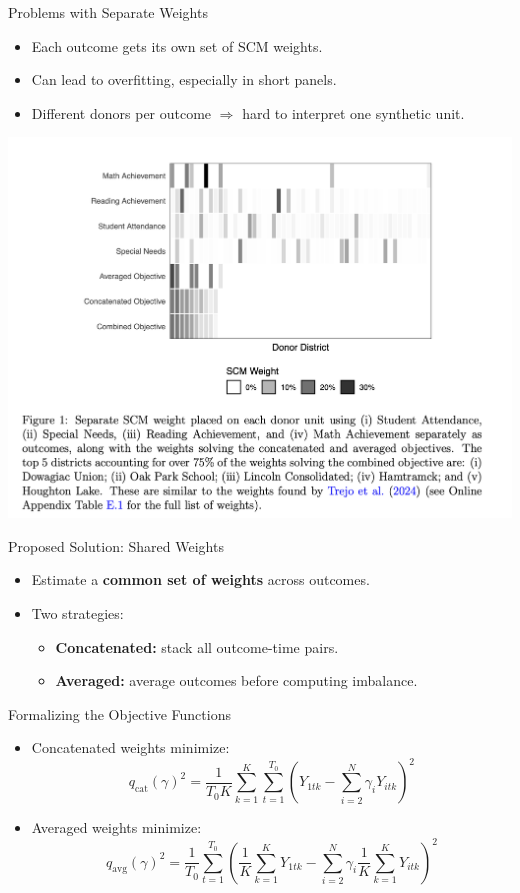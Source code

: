 \documentclass{beamer}
\begin{document}
\begin{frame}{Problems with Separate Weights}
  \begin{itemize}
    \item Each outcome gets its own set of SCM weights.
    \item Can lead to overfitting, especially in short panels.
    \item Different donors per outcome $\Rightarrow$ hard to interpret one synthetic unit.
  \end{itemize}
  \includegraphics[width=0.9\linewidth]{./lecture_includes/figure1_weights.png}
\end{frame}

\begin{frame}{Proposed Solution: Shared Weights}
  \begin{itemize}
    \item Estimate a \textbf{common set of weights} across outcomes.
    \item Two strategies:
    \begin{itemize}
      \item \textbf{Concatenated:} stack all outcome-time pairs.
      \item \textbf{Averaged:} average outcomes before computing imbalance.
    \end{itemize}
  \end{itemize}
\end{frame}

\begin{frame}{Formalizing the Objective Functions}
  \begin{itemize}
    \item Concatenated weights minimize:
    \[ q_{\text{cat}}(\gamma)^2 = \frac{1}{T_0 K} \sum_{k=1}^K \sum_{t=1}^{T_0} \left(Y_{1tk} - \sum_{i=2}^N \gamma_i Y_{itk} \right)^2 \]
    \item Averaged weights minimize:
    \[ q_{\text{avg}}(\gamma)^2 = \frac{1}{T_0} \sum_{t=1}^{T_0} \left( \frac{1}{K} \sum_{k=1}^K Y_{1tk} - \sum_{i=2}^N \gamma_i \frac{1}{K} \sum_{k=1}^K Y_{itk} \right)^2 \]
  \end{itemize}
\end{frame}
\end{document}
